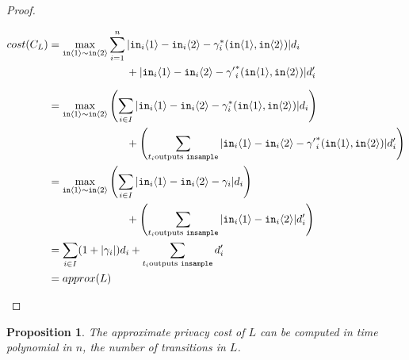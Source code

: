 \documentclass[12pt]{article}
\newcommand{\brangle}[1]{\langle #1 \rangle}
\newtheorem{prop}[thm]{Proposition}
\theoremstyle{definition}
\begin{document}
\begin{proof}
\begin{itemize}
        \begin{align*}
            cost(C_L) &= \max_{\texttt{in}\brangle{1}\sim \texttt{in}\brangle{2}} \sum_{i = 1}^n  |\texttt{in}_i\brangle{1} - \texttt{in}_i\brangle{2} - \gamma_i^*(\texttt{in}\brangle{1}, \texttt{in}\brangle{2})| d_i \\ 
            \phantom{cost(C_L)} &\phantom{=\max_{\texttt{in}\brangle{1}\sim \texttt{in}\brangle{2}}\qquad } + |\texttt{in}_i\brangle{1} - \texttt{in}_i\brangle{2} - {\gamma'}_i^*(\texttt{in}\brangle{1}, \texttt{in}\brangle{2})|d_i' \\
            &= \max_{\texttt{in}\brangle{1}\sim \texttt{in}\brangle{2}} \left(\sum_{i \in I} |\texttt{in}_i\brangle{1} - \texttt{in}_i\brangle{2} - \gamma_i^*(\texttt{in}\brangle{1}, \texttt{in}\brangle{2})| d_i\right) \\
            \phantom{cost(C_L)} &\phantom{=\max_{\texttt{in}\brangle{1}\sim \texttt{in}\brangle{2}}\qquad } + \left(\sum_{t_i \text{outputs \texttt{insample}}}|\texttt{in}_i\brangle{1} - \texttt{in}_i\brangle{2} - {\gamma'}_i^*(\texttt{in}\brangle{1}, \texttt{in}\brangle{2})|d_i'\right)\\
            &= \max_{\texttt{in}\brangle{1}\sim \texttt{in}\brangle{2}} \left(\sum_{i \in I} |\texttt{in}_i\brangle{1} - \texttt{in}_i\brangle{2} - \gamma_i| d_i\right) \\
            \phantom{cost(C_L)} &\phantom{=\max_{\texttt{in}\brangle{1}\sim \texttt{in}\brangle{2}}\qquad } + \left(\sum_{t_i \text{outputs \texttt{insample}}}|\texttt{in}_i\brangle{1} - \texttt{in}_i\brangle{2}|d_i'\right)\\
            &= \sum_{i \in I} (1 + |\gamma_i|) d_i + \sum_{t_i \text{outputs \texttt{insample}}} d_i' \\
            &= approx(L)
        \end{align*}
    \end{itemize}
\end{proof}

\begin{prop}
    The approximate privacy cost of $L$ can be computed in time polynomial in $n$, the number of transitions in $L$.
\end{prop}
\end{document}
